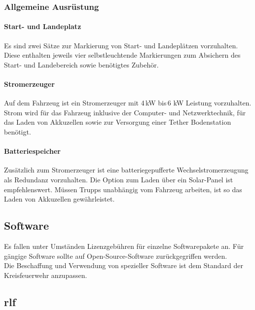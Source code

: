 \subsubsection{Allgemeine Ausrüstung}

\paragraph{Start- und Landeplatz}

Es sind zwei Sätze zur Markierung von Start- und Landeplätzen vorzuhalten. Diese enthalten jeweils vier selbstleuchtende Markierungen zum Absichern des Start- und Landebereich sowie benötigtes Zubehör.

\paragraph{Stromerzeuger}

Auf dem Fahrzeug ist ein Stromerzeuger mit 4\,kW bis\,6 kW Leistung vorzuhalten. Strom wird für das Fahrzeug inklusive der Computer- und Netzwerktechnik, für das Laden von Akkuzellen sowie zur Versorgung einer Tether Bodenstation benötigt.

\paragraph{Batteriespeicher}

Zusätzlich zum Stromerzeuger ist eine batteriegepufferte Wechselstromerzeugung als Redundanz vorzuhalten. Die Option zum Laden über ein Solar-Panel ist empfehlenswert. Müssen Trupps unabhängig vom Fahrzeug arbeiten, ist so das Laden von Akkuzellen gewährleistet.

\subsection{Software}

Es fallen unter Umständen Lizenzgebühren für einzelne Softwarepakete an. Für gängige Software sollte auf Open-Source-Software zurückgegriffen werden.\\

\noindent Die Beschaffung und Verwendung von spezieller Software ist dem Standard der Kreisfeuerwehr \district{} anzupassen.

\subsection{\acf{rlf}}

